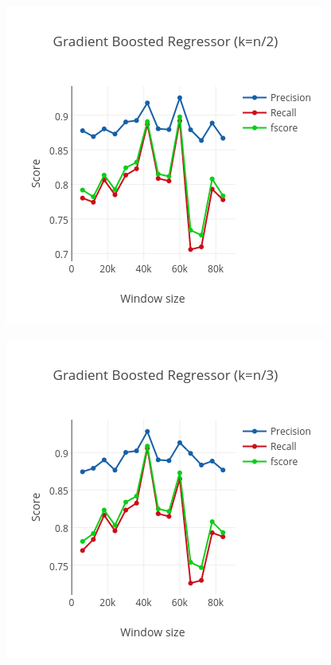 \documentclass[letterpaper,11pt]{article}
\begin{document}
\begin{figure}
\begin{minipage}{.45\linewidth}
  \label{fig:bnn3}
\end{minipage}
\begin{minipage}{.45\linewidth}
  \includegraphics[width=\linewidth]{../data_mapred/img/truncated/gbr2.png}
  \label{fig:gbr2}
\end{minipage}
\begin{minipage}{.45\linewidth}
  \includegraphics[width=\linewidth]{../data_mapred/img/truncated/gbr3.png}

\end{minipage}
\end{figure}
\end{document}
